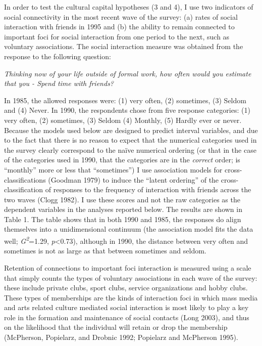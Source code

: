 In order to test the cultural capital hypotheses (3 and 4), I use two indicators of social connectivity in the most recent wave of the survey: (a) rates of social interaction with friends in 1995 and (b) the ability to remain connected to important foci for social interaction from one period to the next, such as voluntary associations. The social interaction measure was obtained from the response to the following question:

\emph{Thinking now of your life outside of formal work, how often would you estimate that you - Spend time with friends?}

In 1985, the allowed responses were: (1) very often, (2) sometimes, (3) Seldom and (4) Never. In 1990, the respondents chose from five response categories: (1) very often, (2) sometimes, (3) Seldom (4) Monthly, (5) Hardly ever or never. Because the models used below are designed to predict interval variables, and due to the fact that there is no reason to expect that the numerical categories used in the survey clearly correspond to the naïve numerical ordering (or that in the case of the categories used in 1990, that the categories are in the \emph{correct} order; is ``monthly'' more or less that ``sometimes'') I use association models for cross-classifications (Goodman 1979) to induce the ``latent ordering'' of the cross-classification of responses to the frequency of interaction with friends across the two waves (Clogg 1982). I use these scores and not the raw categories as the dependent variables in the analyses reported below. The results are shown in Table 1. The table shows that in both 1990 and 1985, the responses do align themselves into a unidimensional continuum (the association model fits the data well; \emph{G\textsuperscript{2}}=1.29, \emph{p}\textless0.73), although in 1990, the distance between very often and sometimes is not as large as that between sometimes and seldom.

Retention of connections to important foci interaction is measured using a scale that simply counts the types of voluntary associations in each wave of the survey: these include private clubs, sport clubs, service organizations and hobby clubs. These types of memberships are the kinds of interaction foci in which mass media and arts related culture mediated social interaction is most likely to play a key role in the formation and maintenance of social contacts (Long 2003), and thus on the likelihood that the individual will retain or drop the membership (McPherson, Popielarz, and Drobnic 1992; Popielarz and McPherson 1995).

